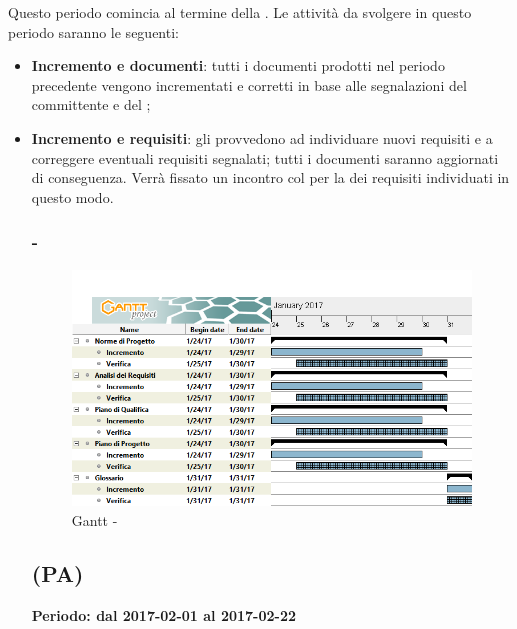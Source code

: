 \documentclass[./PianoDiProgetto.tex]{subfiles}
\begin{document}
  Questo periodo comincia al termine della \PerAR.  Le attività da svolgere in questo periodo saranno le seguenti:
  \begin{itemize}
    \item \textbf{Incremento e  documenti}: tutti i documenti prodotti nel periodo precedente vengono incrementati e corretti in base alle segnalazioni del committente e del ;
    \item \textbf{Incremento e  requisiti}:  gli \ANP{} provvedono ad individuare nuovi requisiti e a correggere eventuali requisiti segnalati; tutti i documenti saranno aggiornati di conseguenza. Verrà fissato un incontro col  per la  dei requisiti individuati in questo modo.
    
  \subsubsection{ - \PerAD}
    \begin{figure}[!h]
    \centering
    \includegraphics[width=\textwidth]{images/AD}
    \caption{Gantt - \PerAD}
    \end{figure}

  \subsection{\PerPA{} (PA)}
  \textbf{Periodo: dal 2017-02-01 al 2017-02-22}


\end{itemize}
\end{document}
